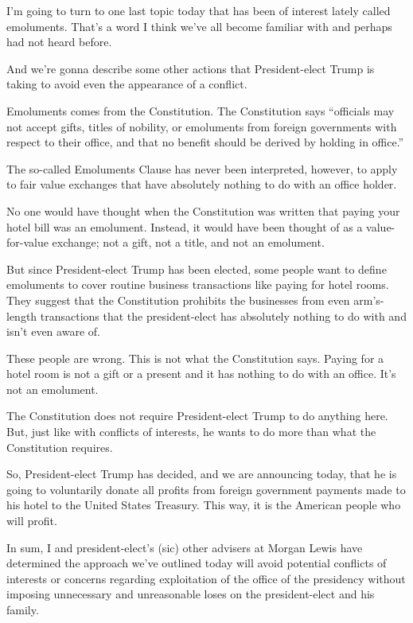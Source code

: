 I'm going to turn to one last topic today that has been of interest
lately called emoluments. That's a word I think we've all become
familiar with and perhaps had not heard before.

And we're gonna describe some other actions that President-elect Trump
is taking to avoid even the appearance of a conflict.

Emoluments comes from the Constitution. The Constitution says
``officials may not accept gifts, titles of nobility, or emoluments from
foreign governments with respect to their office, and that no benefit
should be derived by holding in office.''

The so-called Emoluments Clause has never been interpreted, however, to
apply to fair value exchanges that have absolutely nothing to do with an
office holder.

No one would have thought when the Constitution was written that paying
your hotel bill was an emolument. Instead, it would have been thought of
as a value-for-value exchange; not a gift, not a title, and not an
emolument.

But since President-elect Trump has been elected, some people want to
define emoluments to cover routine business transactions like paying for
hotel rooms. They suggest that the Constitution prohibits the businesses
from even arm's-length transactions that the president-elect has
absolutely nothing to do with and isn't even aware of.

These people are wrong. This is not what the Constitution says. Paying
for a hotel room is not a gift or a present and it has nothing to do
with an office. It's not an emolument.

The Constitution does not require President-elect Trump to do anything
here. But, just like with conflicts of interests, he wants to do more
than what the Constitution requires.

So, President-elect Trump has decided, and we are announcing today, that
he is going to voluntarily donate all profits from foreign government
payments made to his hotel to the United States Treasury. This way, it
is the American people who will profit.

In sum, I and president-elect's (sic) other advisers at Morgan Lewis
have determined the approach we've outlined today will avoid potential
conflicts of interests or concerns regarding exploitation of the office
of the presidency without imposing unnecessary and unreasonable loses on
the president-elect and his family.

